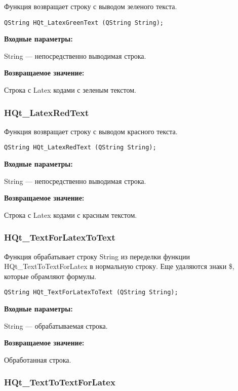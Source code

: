 \documentclass[a4paper,12pt]{article}
\begin{document}
Функция возвращает строку с выводом зеленого текста.


\begin{lstlisting}[label=code_syntax_HQt_LatexGreenText,caption=Синтаксис]
QString HQt_LatexGreenText (QString String);
\end{lstlisting}

\textbf{Входные параметры:}

String --- непосредственно выводимая строка.

\textbf{Возвращаемое значение:}

Строка с Latex кодами с зеленым текстом.


\subsubsection{HQt\_LatexRedText}\label{HQt_LatexRedText}

Функция возвращает строку с выводом красного текста.


\begin{lstlisting}[label=code_syntax_HQt_LatexRedText,caption=Синтаксис]
QString HQt_LatexRedText (QString String);
\end{lstlisting}

\textbf{Входные параметры:}

String --- непосредственно выводимая строка.

\textbf{Возвращаемое значение:}

Строка с Latex кодами с красным текстом.


\subsubsection{HQt\_TextForLatexToText}\label{HQt_TextForLatexToText}

Функция обрабатывает строку String из переделки функции HQt\_TextToTextForLatex в нормальную строку. Еще удаляются знаки \$, которые обрамляют формулы.


\begin{lstlisting}[label=code_syntax_HQt_TextForLatexToText,caption=Синтаксис]
QString HQt_TextForLatexToText (QString String);
\end{lstlisting}

\textbf{Входные параметры:}

String --- обрабатываемая строка.

\textbf{Возвращаемое значение:}
 
Обработанная строка.


\subsubsection{HQt\_TextToTextForLatex}\label{HQt_TextToTextForLatex}
\end{document}
